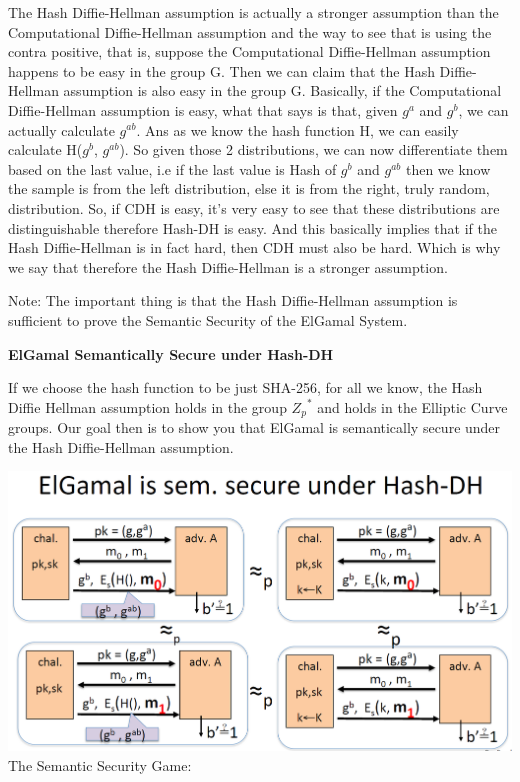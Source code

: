 \documentclass[11pt]{article}
\makeatletter
\def\maxwidth{\ifdim\Gin@nat@width>\linewidth\linewidth
    \else\Gin@nat@width\fi}
\let\Oldincludegraphics\includegraphics
\renewcommand{\includegraphics}[1]{\Oldincludegraphics[width=.8\maxwidth]{#1}}
\makeatother
\begin{document}
The Hash Diffie-Hellman assumption is actually a stronger assumption
than the Computational Diffie-Hellman assumption and the way to see that
is using the contra positive, that is, suppose the Computational
Diffie-Hellman assumption happens to be easy in the group G. Then we can
claim that the Hash Diffie-Hellman assumption is also easy in the group
G. Basically, if the Computational Diffie-Hellman assumption is easy,
what that says is that, given \(g^{a}\) and \(g^{b}\), we can actually
calculate \(g^{ab}\). Ans as we know the hash function H, we can easily
calculate H(\(g^{b}\), \(g^{ab}\)). So given those 2 distributions, we
can now differentiate them based on the last value, i.e if the last
value is Hash of \(g^{b}\) and \(g^{ab}\) then we know the sample is
from the left distribution, else it is from the right, truly random,
distribution. So, if CDH is easy, it's very easy to see that these
distributions are distinguishable therefore Hash-DH is easy. And this
basically implies that if the Hash Diffie-Hellman is in fact hard, then
CDH must also be hard. Which is why we say that therefore the Hash
Diffie-Hellman is a stronger assumption.

Note: The important thing is that the Hash Diffie-Hellman assumption is
sufficient to prove the Semantic Security of the ElGamal System.

\textbf{ElGamal Semantically Secure under Hash-DH}

If we choose the hash function to be just SHA-256, for all we know, the
Hash Diffie Hellman assumption holds in the group \({Z_p}^{*}\) and
holds in the Elliptic Curve groups. Our goal then is to show you that
ElGamal is semantically secure under the Hash Diffie-Hellman assumption.

\includegraphics{./Images/ElGamal-SSunderHashDH.png} The Semantic
Security Game:
\end{document}
